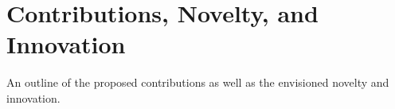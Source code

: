 \chapter{Contributions, Novelty, and Innovation}

An outline of the proposed contributions as well as the envisioned novelty and innovation. 
